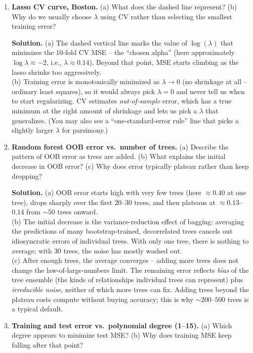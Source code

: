 \documentclass[11pt]{article}
\newcommand{\solution}[1]{%
  \par\medskip\noindent\textbf{Solution.} #1\par\medskip
}
\begin{document}
\begin{enumerate}[leftmargin=*]
\item \textbf{Lasso CV curve, Boston.} (a) What does the dashed line represent? (b) Why do we usually choose $\lambda$ using CV rather than selecting the smallest training error?

\solution{(a) The dashed vertical line marks the value of $\log(\lambda)$ that minimizes the 10-fold CV MSE -- the ``chosen alpha'' (here approximately $\log\lambda \approx -2$, i.e., $\lambda \approx 0.14$). Beyond that point, MSE starts climbing as the lasso shrinks too aggressively.\\
(b) Training error is monotonically minimized as $\lambda \to 0$ (no shrinkage at all -- ordinary least squares), so it would always pick $\lambda = 0$ and never tell us when to start regularizing. CV estimates \emph{out-of-sample} error, which has a true minimum at the right amount of shrinkage and lets us pick a $\lambda$ that generalizes. (You may also see a ``one-standard-error rule'' line that picks a slightly larger $\lambda$ for parsimony.)}

\item \textbf{Random forest OOB error vs.~number of trees.} (a) Describe the pattern of OOB error as trees are added. (b) What explains the initial decrease in OOB error? (c) Why does error typically plateau rather than keep dropping?

\solution{(a) OOB error starts high with very few trees (here $\approx 0.40$ at one tree), drops sharply over the first 20--30 trees, and then plateaus at $\approx 0.13$--$0.14$ from $\sim 50$ trees onward.\\
(b) The initial decrease is the variance-reduction effect of bagging: averaging the predictions of many bootstrap-trained, decorrelated trees cancels out idiosyncratic errors of individual trees. With only one tree, there is nothing to average; with 30 trees, the noise has mostly washed out.\\
(c) After enough trees, the average converges -- adding more trees does not change the law-of-large-numbers limit. The remaining error reflects \emph{bias} of the tree ensemble (the kinds of relationships individual trees can represent) plus \emph{irreducible noise}, neither of which more trees can fix. Adding trees beyond the plateau costs compute without buying accuracy; this is why $\sim 200$--$500$ trees is a typical default.}

\item \textbf{Training and test error vs.~polynomial degree (1--15).} (a) Which degree appears to minimize test MSE? (b) Why does training MSE keep falling after that point?


\end{enumerate}
\end{document}

